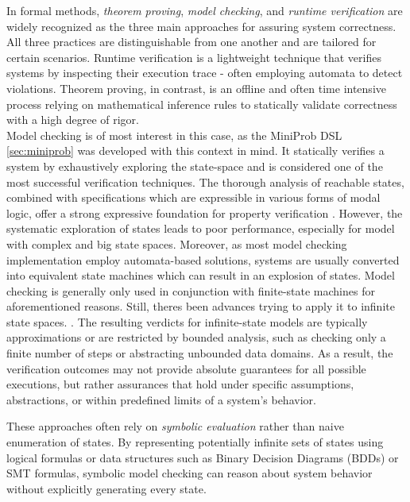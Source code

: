 In formal methods, \textit{theorem proving}, \textit{model checking}, and \textit{runtime verification} are widely recognized as the three main approaches for assuring
system correctness\cite{formalMethodsBig3,formalMethodsCPSCritical}.
All three practices are distinguishable from one another and are tailored for certain scenarios. Runtime verification is a lightweight technique that verifies systems
by inspecting their execution trace - often employing automata to detect violations. Theorem proving, in contrast, is an offline and often time intensive
process relying on mathematical inference rules to statically validate correctness with a high degree of rigor.\\

Model checking is of most interest in this case, as the MiniProb DSL \ref{sec:miniprob} was developed with this context in mind. \cite{POPACheck}
It statically verifies a system by exhaustively exploring the state-space and is considered one of the most successful verification techniques. \cite{formalMethodsCPSCritical}
The thorough analysis of reachable states, combined with specifications which are expressible in various forms of modal logic,
offer a strong expressive foundation for property verification \cite{modelCheckingPrinceples}. However, the systematic exploration of states leads to poor performance, especially for model with
complex and big state spaces. Moreover, as most model checking implementation employ automata-based solutions, systems are usually converted into
equivalent state machines which can result in an explosion of states.\cite{}
Model checking is generally only used in conjunction with finite-state machines for aforementioned reasons. Still, theres been advances trying to apply it to infinite state spaces.
\cite{modelCheckingInfCounter,modelCheckingInfSymb}. The resulting verdicts for infinite-state models are typically approximations or are restricted by bounded analysis,
such as checking only a finite number of steps or abstracting unbounded data domains. As a result, the verification outcomes may not provide absolute guarantees for all
possible executions, but rather assurances that hold under specific assumptions, abstractions, or within predefined limits of a system's behavior.

These approaches often rely on \textit{symbolic evaluation} rather than naive enumeration of states. By representing potentially infinite sets of states using logical
formulas or data structures such as Binary Decision Diagrams (BDDs) or SMT formulas, symbolic model checking can reason about system behavior without explicitly
generating every state.

